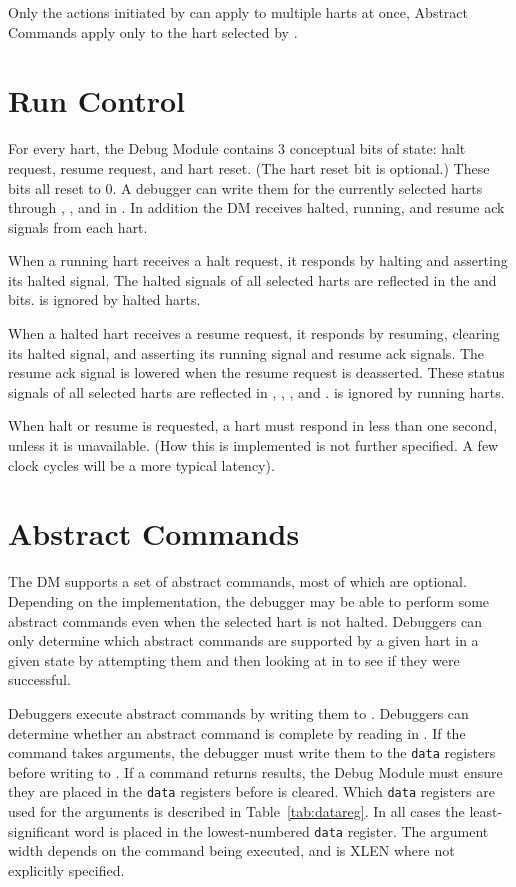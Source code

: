 Only the actions initiated by \Rdmcontrol can apply to multiple harts
at once, Abstract Commands apply only to the hart selected by
\Fhartsel.

\section{Run Control} \label{runcontrol}

For every hart, the Debug Module contains 3 conceptual bits of state: halt
request, resume request, and hart reset. (The hart reset bit is optional.)
These bits all reset to 0. A debugger can write them for the currently selected
harts through \Fhaltreq, \Fresumereq, and \Fhartreset in \Rdmcontrol. In
addition the DM receives halted, running, and resume ack signals from each
hart.

When a running hart receives a halt request, it responds by halting and
asserting its halted signal. The halted signals of all selected harts are
reflected in the \Fallhalted and \Fanyhalted bits. \Fhaltreq is ignored by
halted harts.

When a halted hart receives a resume request, it responds by resuming, clearing
its halted signal, and asserting its running signal and resume ack signals. The
resume ack signal is lowered when the resume request is deasserted.  These
status signals of all selected harts are reflected in \Fallresumeack,
\Fanyresumeack, \Fallrunning, and \Fanyrunning. \Fresumereq is ignored by
running harts.

When halt or resume is requested, a hart must respond in
less than one second, unless it is unavailable.
(How this is implemented is not further specified. A few
clock cycles will be a more typical latency).

\section{Abstract Commands} \label{abstractcommands}

The DM supports a set of abstract commands, most of which
are optional. Depending on the implementation, the debugger may
be able to perform
some abstract commands even when the selected hart is not halted.
Debuggers can only determine which abstract commands
are supported by a given hart in a given state by attempting them
and then looking at \Fcmderr in \Rabstractcs to see if they were successful.

Debuggers execute abstract commands by writing them to \Rcommand.
Debuggers can determine whether an abstract command is complete by
reading \Fbusy in \Rabstractcs.
If the command takes arguments, the debugger
must write them to the {\tt data} registers before writing to \Rcommand. If a
command returns results, the Debug Module must ensure they are placed
in the {\tt data} registers before \Fbusy is cleared.
Which {\tt data} registers are used for the arguments is
described in Table~\ref{tab:datareg}.  In all cases the least-significant word
is placed in the lowest-numbered {\tt data} register. The argument width
depends on the command being executed, and is XLEN where not explicitly
specified.

